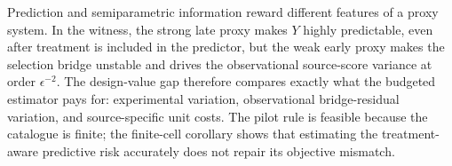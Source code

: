 Prediction and semiparametric information reward different features of a proxy system.  In the witness, the strong late proxy makes \(Y\) highly predictable, even after treatment is included in the predictor, but the weak early proxy makes the selection bridge unstable and drives the observational source-score variance at order \(\epsilon^{-2}\).  The design-value gap therefore compares exactly what the budgeted estimator pays for: experimental variation, observational bridge-residual variation, and source-specific unit costs.  The pilot rule is feasible because the catalogue is finite; the finite-cell corollary shows that estimating the treatment-aware predictive risk accurately does not repair its objective mismatch.